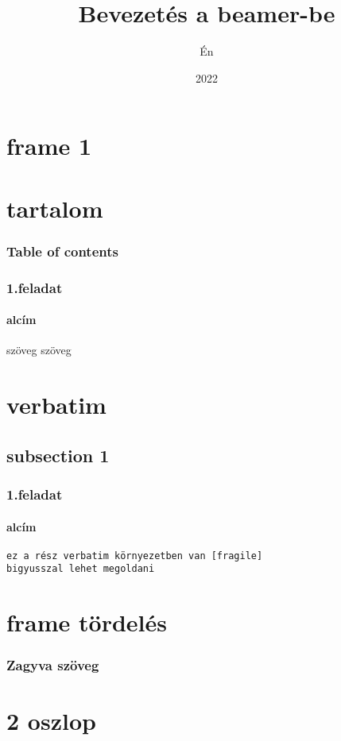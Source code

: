 \documentclass[12pt,aspectratoio=169]{beamer}
\title{Bevezetés a beamer-be}
\author{Én}
\date{2022}
\begin{document}
\section{frame 1}
\frame{\titlepage}

\section{tartalom}
\begin{frame}
\frametitle{Table of contents}
\tableofcontents
\end{frame}

\begin{frame}
\frametitle{1.feladat}
\framesubtitle{alcím}
szöveg szöveg 
\end{frame}

\section{verbatim}
\subsection{subsection 1}
\begin{frame}[fragile]
\frametitle{1.feladat}
\framesubtitle{alcím}
\begin{verbatim}
ez a rész verbatim környezetben van [fragile]
bigyusszal lehet megoldani
\end{verbatim}
\end{frame}

\section{frame tördelés}
\begin{frame}[allowframebreaks]
\frametitle{Zagyva szöveg}
\lipsum[1-2]
\end{frame}

\section{2 oszlop}
\end{document}
